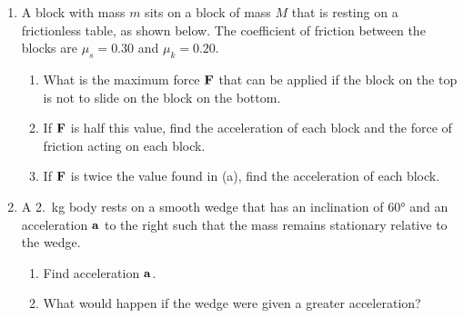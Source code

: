 \documentclass{../../../oss-classkick}
\begin{document}
\begin{enumerate}
\item A block with mass $m$ sits on a block of mass $M$ that is resting on a
  frictionless table, as shown below. The coefficient of friction between the
  blocks are $\mu_s=0.30$ and $\mu_k=0.20$.
  \begin{enumerate}[nosep]
  \item What is the maximum force $\mathbf{F}$ that can be applied if the block on
    the top is not to slide on the block on the bottom.
  \item If $\mathbf{F}$ is half this value, find the acceleration of each block and
    the force of friction acting on each block.
  \item If $\mathbf{F}$ is twice the value found in (a), find the acceleration of
    each block.
  \end{enumerate}
  \vspace{2.25in}
  \newpage
  
\item A \SI{2.}{\kilo\gram} body rests on a smooth wedge that has an inclination
  of \ang{60} and an acceleration $\mathbf{a}$ to the right such that the mass
  remains stationary relative to the wedge.
  \begin{enumerate}
  \item Find acceleration $\mathbf{a}$.
  \item What would happen if the wedge were given a greater acceleration?
  \end{enumerate}
  \newpage
  

\end{enumerate}
\end{document}
